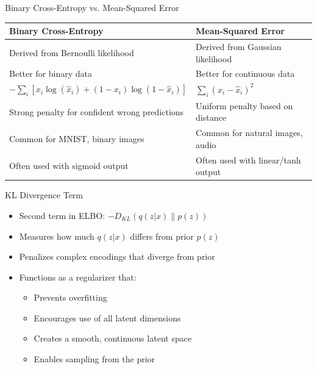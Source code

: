 \documentclass[5pt,aspectratio=169]{beamer}
\begin{document}
\begin{frame}{Binary Cross-Entropy vs. Mean-Squared Error}
  \begin{center}
    \begin{tabular}{p{7cm}|p{7cm}}
      \toprule
      \textbf{Binary Cross-Entropy} & \textbf{Mean-Squared Error} \\
      \midrule
      Derived from Bernoulli likelihood & Derived from Gaussian likelihood \\
      \midrule
      Better for binary data & Better for continuous data \\
      \midrule
      $-\sum_i [x_i \log(\hat{x}_i) + (1-x_i)\log(1-\hat{x}_i)]$ & $\sum_i (x_i - \hat{x}_i)^2$ \\
      \midrule
      Strong penalty for confident wrong predictions & Uniform penalty based on distance\\
      \midrule
      Common for MNIST, binary images & Common for natural images, audio \\
      \midrule
      Often used with sigmoid output & Often used with linear/tanh output \\
      \bottomrule
    \end{tabular}
  \end{center}

\end{frame}


\begin{frame}{KL Divergence Term}
\begin{itemize}
\item Second term in ELBO: $-D_{KL}(q(z|x) \| p(z))$
\item Measures how much $q(z|x)$ differs from prior $p(z)$
\item Penalizes complex encodings that diverge from prior
\item Functions as a regularizer that:
  \begin{itemize}
  \item Prevents overfitting
  \item Encourages use of all latent dimensions
  \item Creates a smooth, continuous latent space
  \item Enables sampling from the prior
  \end{itemize}
\end{itemize}
\end{frame}
\end{document}

